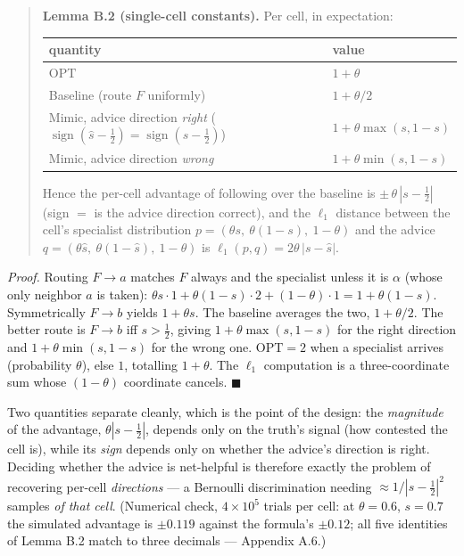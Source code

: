 \begin{quote}
\textbf{Lemma B.2 (single-cell constants).} Per cell, in expectation:

{ %
\begin{longtable}[]{@{}
  >{\raggedright\arraybackslash}p{}
  >{\raggedright\arraybackslash}p{}@{}}
\toprule\noalign{}
\begin{minipage}[b]{\linewidth}\raggedright
quantity
\end{minipage} & \begin{minipage}[b]{\linewidth}\raggedright
value
\end{minipage} \\
\midrule\noalign{}
\endhead
\bottomrule\noalign{}
\endlastfoot
\(\mathrm{OPT}\) & \(1+\theta\) \\
Baseline (route \(F\) uniformly) & \(1+\theta/2\) \\
Mimic, advice direction \emph{right}
(\(\operatorname{sign}(\hat s-\tfrac12)=\operatorname{sign}(s-\tfrac12)\))
& \(1+\theta\max(s,1-s)\) \\
Mimic, advice direction \emph{wrong} & \(1+\theta\min(s,1-s)\) \\
\end{longtable}
}

Hence the per-cell advantage of following over the baseline is
\(\pm\,\theta\,|s-\tfrac12|\) (sign \(=\) is the advice direction
correct), and the \(\ell_1\) distance between the cell's specialist
distribution \(p=(\theta s,\ \theta(1-s),\ 1-\theta)\) and the advice
\(q=(\theta\hat s,\ \theta(1-\hat s),\ 1-\theta)\) is
\(\ell_1(p,q)=2\theta\,|s-\hat s|\).
\end{quote}

\emph{Proof.} Routing \(F\to a\) matches \(F\) always and the specialist
unless it is \(\alpha\) (whose only neighbor \(a\) is taken):
\(\theta s\cdot 1+\theta(1-s)\cdot 2+(1-\theta)\cdot 1 = 1+\theta(1-s)\).
Symmetrically \(F\to b\) yields \(1+\theta s\). The baseline averages
the two, \(1+\theta/2\). The better route is \(F\to b\) iff
\(s>\tfrac12\), giving \(1+\theta\max(s,1-s)\) for the right direction
and \(1+\theta\min(s,1-s)\) for the wrong one. \(\mathrm{OPT}=2\) when a
specialist arrives (probability \(\theta\)), else \(1\), totalling
\(1+\theta\). The \(\ell_1\) computation is a three-coordinate sum whose
\((1-\theta)\) coordinate cancels. \(\blacksquare\)

Two quantities separate cleanly, which is the point of the design: the
\emph{magnitude} of the advantage, \(\theta|s-\tfrac12|\), depends only
on the truth's signal (how contested the cell is), while its \emph{sign}
depends only on whether the advice's direction is right. Deciding
whether the advice is net-helpful is therefore exactly the problem of
recovering per-cell \emph{directions} --- a Bernoulli discrimination
needing \(\approx 1/|s-\tfrac12|^2\) samples \emph{of that cell}.
(Numerical check, \(4\times10^5\) trials per cell: at \(\theta=0.6\),
\(s=0.7\) the simulated advantage is \(\pm0.119\) against the formula's
\(\pm0.12\); all five identities of Lemma B.2 match to three decimals
--- Appendix A.6.)

